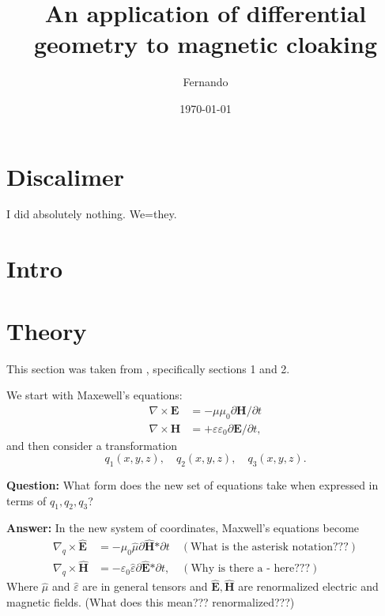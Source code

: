\documentclass{amsart}
\begin{document}
\newcommand{\R}{\mathbb{R}}

\title{An application of differential geometry to magnetic cloaking}
\author{Fernando}
\date{\today}
\maketitle

\section{Discalimer}
I did absolutely nothing. We=they.
\section{Intro}
\blindtext[1]
\section{Theory}
This section was taken from \cite{ward96}, specifically sections 1 and 2.

We start with Maxewell's equations:
\begin{align*}
  \nabla \times \textbf{E} &= -\mu \mu_0 \partial \textbf{H} /\partial t\\
  \nabla \times \textbf{H} &= +\varepsilon \varepsilon_0 \partial \textbf{E} /\partial t,
\end{align*}
and then consider a transformation
\[
q_1(x,y,z), \quad q_2(x,y,z), \quad q_3(x,y,z).
\]

\textbf{Question:} What form does the new set of equations take when
expressed in terms of $q_1,q_2,q_3$?

\textbf{Answer:} In the new system of coordinates, Maxwell's equations become
\begin{align*}
  \nabla_q \times \widehat{\textbf{E}} &= -\mu_0\hat{\mu} \partial \widehat{\textbf{H}} \textbf{*}\partial t\quad (\text{What is the asterisk notation???})\\
\nabla_q \times \widehat{\textbf{H}} &= -\varepsilon_0 \hat{\varepsilon} \partial \widehat{\textbf{E}}\textbf{*}\partial t,\quad (\text{Why is there a - here???})
\end{align*}
Where $\hat{\mu}$ and $\hat{\varepsilon}$ are in general tensors and $\hat{\textbf{E}},\hat{\textbf{H}}$ are renormalized electric and magnetic fields. (What does this mean??? renormalized???)
\end{document}
